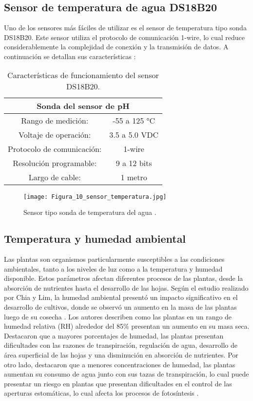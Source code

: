 \subsection{Sensor de temperatura de agua DS18B20}
Uno de los sensores más fáciles de utilizar es el sensor de temperatura tipo sonda DS18B20. Este sensor utiliza el protocolo de comunicación 1-wire, lo cual reduce considerablemente la complejidad de conexión y la transmisión de datos. A continuación se detallan sus características \cite{la_electronica_DS18B20}:

\begin{table}[H]
	\centering
	\begin{tabular}{|c|c|}
		\hline
		\multicolumn{2}{|c|}{\textbf{Sonda del sensor de pH}}\\ \hline
		Rango de medición: & -55 a 125 °C \\ \hline
		Voltaje de operación: & 3.5 a 5.0 VDC \\ \hline
		Protocolo de comunicación: & 1-wire \\ \hline
		Resolución programable: & 9 a 12 bits \\ \hline
		Largo de cable: & 1 metro \\ \hline
	\end{tabular}
	\caption{Características de funcionamiento del sensor DS18B20.}
	\label{Cuadro4}
\end{table}

\begin{figure}[H]
	\centering
	\texttt{[image: Figura\_10\_sensor\_temperatura.jpg]}
	\caption{Sensor tipo sonda de temperatura del agua \cite{la_electronica_DS18B20}.}
	\label{fig:mesh10}
\end{figure}

\subsection{Temperatura y humedad ambiental}
Las plantas son organismos particularmente susceptibles a las condiciones ambientales, tanto a los niveles de luz como a la temperatura y humedad disponible. Estos parámetros afectan diferentes procesos de las plantas, desde la absorción de nutrientes hasta el desarrollo de las hojas. Según el estudio realizado por Chia y Lim, la humedad ambiental presentó un impacto significativo en el desarrollo de cultivos, donde se observó un aumento en la masa de las plantas luego de su cosecha \cite{chia_critical_2022}. Los autores describen como las plantas en un rango de humedad relativa (RH) alrededor del 85\% presentan un aumento en su masa seca. Destacaron que a mayores porcentajes de humedad, las plantas presentan dificultades con las razones de transpiración, regulación de agua, desarrollo de área superficial de las hojas y una disminución en absorción de nutrientes. Por otro lado, destacaron que a menores concentraciones de humedad, las plantas aumentan su consumo de agua junto con sus tazas de transpiración, lo cual puede presentar un riesgo en plantas que presentan dificultades en el control de las aperturas estomáticas, lo cual afecta los procesos de fotosíntesis \cite{chia_critical_2022}.

